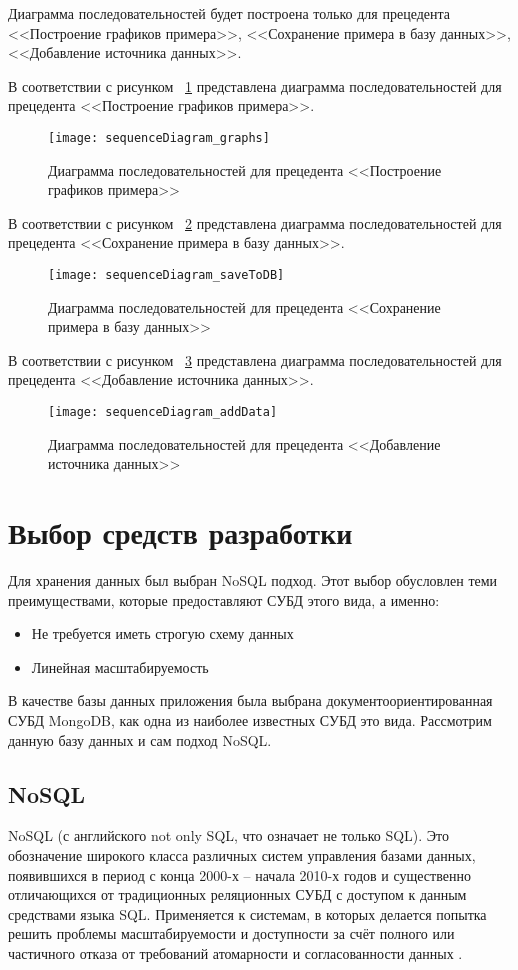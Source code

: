 \documentclass[14pt]{extreport}
\begin{document}
Диаграмма последовательностей будет построена только для прецедента <<Построение графиков примера>>, <<Сохранение примера в базу данных>>, <<Добавление источника 
данных>>.

В соответствии с рисунком ~\ref{fig9} представлена диаграмма последовательностей для прецедента <<Построение графиков примера>>.

\begin{figure}[H]
\centerline{\texttt{[image: sequenceDiagram\_graphs]}}
\caption{Диаграмма последовательностей для прецедента <<Построение графиков примера>>}
\label{fig9}
\end{figure}

В соответствии с рисунком ~\ref{fig10} представлена диаграмма последовательностей для прецедента <<Сохранение примера в базу данных>>.

\begin{figure}[H]
\centerline{\texttt{[image: sequenceDiagram\_saveToDB]}}
\caption{Диаграмма последовательностей для прецедента <<Сохранение примера в базу данных>>}
\label{fig10}
\end{figure}

В соответствии с рисунком ~\ref{fig11} представлена диаграмма последовательностей для прецедента <<Добавление источника данных>>.

\begin{figure}[H]
\centerline{\texttt{[image: sequenceDiagram\_addData]}}
\caption{Диаграмма последовательностей для прецедента <<Добавление источника 
данных>>}
\label{fig11}
\end{figure}

\chapter{Выбор средств разработки}
Для хранения данных был выбран NoSQL подход. Этот выбор обусловлен теми преимуществами, которые предоставляют СУБД этого вида, а именно:
\begin{itemize}
\item Не требуется иметь строгую схему данных
\item Линейная масштабируемость
\end{itemize}

В качестве базы данных приложения была выбрана документоориентированная СУБД MongoDB, как одна из наиболее известных СУБД это вида. Рассмотрим данную базу данных и сам подход NoSQL.


\section{NoSQL}
NoSQL (с английского not only SQL, что означает не только SQL). Это обозначение широкого класса различных систем управления базами данных, появившихся в период с конца 2000-х -- начала 2010-х годов и существенно отличающихся от традиционных реляционных СУБД с доступом к данным средствами языка SQL. Применяется к системам, в которых делается попытка решить проблемы масштабируемости и доступности за счёт полного или частичного отказа от требований атомарности и согласованности данных \cite{nosqlFauler}. 
\end{document}
